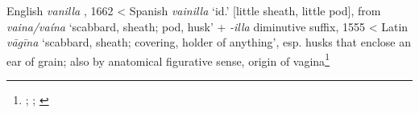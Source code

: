 \begin{etymology}\label{ety:vanilla}
English \textit{vanilla }, 1662
< Spanish \textit{vainilla} `id.' [little sheath, little pod], from \textit{vaina/vaína} `scabbard, sheath; pod, husk' + \textit{-illa} diminutive suffix, 1555
< Latin \textit{vāgīna} `scabbard, sheath; covering, holder of anything', esp. husks that enclose an ear of grain; also by anatomical figurative sense, origin of vagina\footnote{\textcite[s.v. vanilla]{oed}; \textcites[538]{gomez_de_silva_elseviers_1985}[596]{corominas_breve_1987}; \textcite[s.v. vāgīna]{lewis_latin_1879}}
\end{etymology}